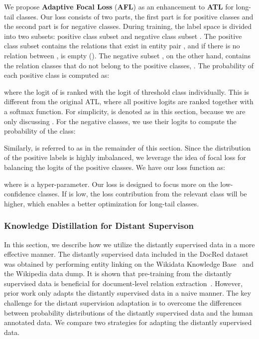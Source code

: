 \documentclass[11pt]{article}
\begin{document}
We propose \textbf{Adaptive Focal Loss} (\textbf{AFL}) as an enhancement to \textbf{ATL} for long-tail classes. Our loss consists of two parts, the first part is for positive classes and the second part is for negative classes. During training, the label space is divided into two subsets: positive class subset  and negative class subset . The positive class subset  contains the relations that exist in entity pair , and if there is no relation between ,  is empty (). The negative subset , on the other hand, contains the relation classes that do not belong to the positive classes, . The probability of each positive class is computed as:

where the logit of  is ranked with the logit of threshold class  individually. This is different from the original ATL, where all positive logits are ranked together with a softmax function. For simplicity,  is denoted as  in this section, because we are only discussing . For the negative classes, we use their logits to compute the probability of the  class:

Similarly,  is referred to as  in the remainder of this section. Since the distribution of the positive labels is highly imbalanced, we leverage the idea of focal loss \citep{lin2017focal} for balancing the logits of the positive classes. We have our loss function as:

where  is a hyper-parameter. Our loss is designed to focus more on the low-confidence classes. If  is low, the loss contribution from the relevant class will be higher, which enables a better optimization for long-tail classes.  

\subsubsection{Knowledge Distillation for Distant Supervison}
In this section, we describe how we utilize the distantly supervised data in a more effective manner. The distantly supervised data included in the DocRed dataset \citep{yao2019docred} was obtained by performing entity linking on the Wikidata Knowledge Base~\citep{vrandevcic2014wikidata} and the Wikipedia data dump.  It is shown that pre-training from the distantly supervised data is beneficial for document-level relation extraction~\citep{xu2021entity}. However, prior work only adapts the distantly supervised data in a naive manner. The key challenge for the distant supervision adaptation is to overcome the differences between probability distributions of the distantly supervised data and the human annotated data. We compare two strategies for adapting the distantly supervised data.
\end{document}
